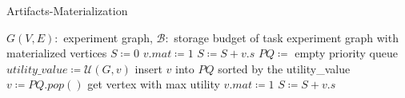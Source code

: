 \begin{algorithm}[h]
\caption{Artifacts-Materialization}\label{algorithm-materialization}
\begin{algorithmic}[1]
\Require  $G(V,E):$ experiment graph, $\mathcal{B}:$ storage budget of task
\Ensure experiment graph with materialized vertices
\State $S \coloneqq 0$ 
 
		\State $v.mat \coloneqq 1$
		\State $S \coloneqq S + v.s$
	\EndIf
\EndFor
\State $PQ \coloneqq $ empty priority queue
		\State $utility\_value \coloneqq \mathcal{U}(G, v)$
		\State insert $v$ into $PQ$ sorted by the utility\_value
	\EndIf
\EndFor
{}
\State $v \coloneqq PQ.pop()$  \Comment get vertex with max utility
\State $v.mat \coloneqq 1$
\State $S \coloneqq S + v.s$		
\EndIf
\EndWhile
\end{algorithmic}
\end{algorithm}


